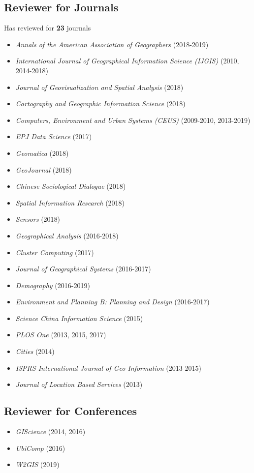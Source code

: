 \documentclass[11pt, a4paper]{article}
\begin{document}
\subsection*{Reviewer for Journals}
Has reviewed for \textbf{23} journals
\begin{itemize}
  \setlength\itemsep{0em}
  \item \emph{Annals of the American Association of Geographers} (2018-2019)  
  \item \emph{International Journal of Geographical Information Science (IJGIS)} (2010, 2014-2018)
  \item \emph{Journal of Geovisualization and Spatial Analysis} (2018)
  \item \emph{Cartography and Geographic Information Science} (2018)
  \item \emph{Computers, Environment and Urban Systems (CEUS)} (2009-2010, 2013-2019)
  \item \emph{EPJ Data Science} (2017)
  \item \emph{Geomatica} (2018)
  \item \emph{GeoJournal} (2018)
  \item \emph{Chinese Sociological Dialogue} (2018)
  \item \emph{Spatial Information Research} (2018)
  \item \emph{Sensors} (2018)
  \item \emph{Geographical Analysis} (2016-2018)
  \item \emph{Cluster Computing} (2017)
  \item \emph{Journal of Geographical Systems} (2016-2017)
  \item \emph{Demography} (2016-2019)
  \item \emph{Environment and Planning B: Planning and Design} (2016-2017)
  \item \emph{Science China Information Science} (2015)
  \item \emph{PLOS One} (2013, 2015, 2017)
  \item \emph{Cities} (2014)
  \item \emph{ISPRS International Journal of Geo-Information} (2013-2015)
  \item \emph{Journal of Location Based Services} (2013)
\end{itemize} 

\subsection*{Reviewer for Conferences}
\begin{itemize}
  \setlength\itemsep{0em}
  \item \emph{GIScience} (2014, 2016)
  \item \emph {UbiComp} (2016)
  \item \emph {W2GIS} (2019)
\end{itemize}
\end{document}
